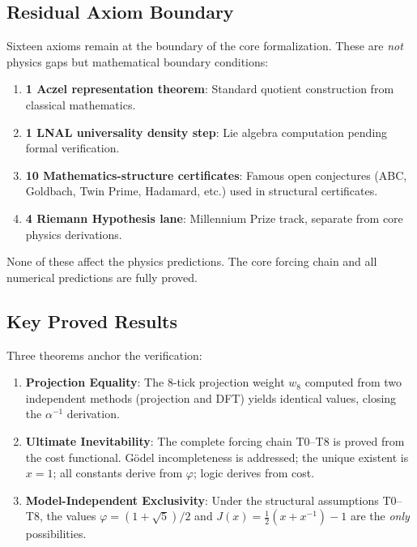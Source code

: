 \documentclass[12pt,a4paper]{article}
\theoremstyle{definition}
\theoremstyle{remark}
\begin{document}
\subsection{Residual Axiom Boundary}

Sixteen axioms remain at the boundary of the core formalization.
These are \emph{not} physics gaps but mathematical boundary conditions:
\begin{enumerate}
  \item \textbf{1 Aczel representation theorem}: Standard quotient
  construction from classical mathematics.
  \item \textbf{1 LNAL universality density step}: Lie algebra
  computation pending formal verification.
  \item \textbf{10 Mathematics-structure certificates}: Famous open
  conjectures (ABC, Goldbach, Twin Prime, Hadamard, etc.) used in
  structural certificates.
  \item \textbf{4 Riemann Hypothesis lane}: Millennium Prize track,
  separate from core physics derivations.
\end{enumerate}

None of these affect the physics predictions.  The core forcing chain
and all numerical predictions are fully proved.

\subsection{Key Proved Results}

Three theorems anchor the verification:
\begin{enumerate}
  \item \textbf{Projection Equality}: The 8-tick projection weight
  $w_8$ computed from two independent methods (projection and DFT)
  yields identical values, closing the $\alpha^{-1}$ derivation.

  \item \textbf{Ultimate Inevitability}: The complete forcing chain
  T0--T8 is proved from the cost functional.  G\"odel
  incompleteness is addressed; the unique existent is $x = 1$; all
  constants derive from $\varphi$; logic derives from cost.

  \item \textbf{Model-Independent Exclusivity}: Under the structural
  assumptions T0--T8, the values $\varphi = (1+\sqrt{5})/2$ and
  $J(x) = \tfrac{1}{2}(x + x^{-1}) - 1$ are the \emph{only}
  possibilities.
\end{enumerate}
\end{document}
